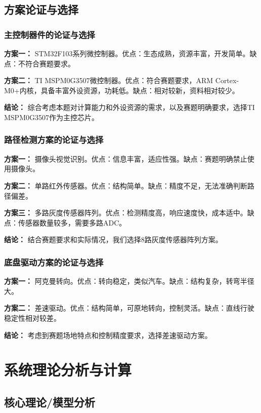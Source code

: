 \documentclass[UTF8]{ctexart}
\begin{document}
\subsection{方案论证与选择}

\subsubsection{主控制器件的论证与选择}

\textbf{方案一：} STM32F103系列微控制器。优点：生态成熟，资源丰富，开发简单。缺点：不符合赛题要求。

\textbf{方案二：} TI MSPM0G3507微控制器。优点：符合赛题要求，ARM Cortex-M0+内核，具备丰富外设资源，功耗低。缺点：相对较新，资料相对较少。

\textbf{结论：} 综合考虑本题对计算能力和外设资源的需求，以及赛题明确要求，选择TI MSPM0G3507作为主控芯片。

\subsubsection{路径检测方案的论证与选择}

\textbf{方案一：} 摄像头视觉识别。优点：信息丰富，适应性强。缺点：赛题明确禁止使用摄像头。

\textbf{方案二：} 单路红外传感器。优点：结构简单。缺点：精度不足，无法准确判断路径偏差。

\textbf{方案三：} 多路灰度传感器阵列。优点：检测精度高，响应速度快，成本适中。缺点：传感器数量较多，需要多路ADC。

\textbf{结论：} 结合赛题要求和实际情况，我们选择8路灰度传感器阵列方案。

\subsubsection{底盘驱动方案的论证与选择}

\textbf{方案一：} 阿克曼转向。优点：转向稳定，类似汽车。缺点：结构复杂，转弯半径大。

\textbf{方案二：} 差速驱动。优点：结构简单，可原地转向，控制灵活。缺点：直线行驶稳定性相对较差。

\textbf{结论：} 考虑到赛题场地特点和控制精度要求，选择差速驱动方案。

\section{系统理论分析与计算}

\subsection{核心理论/模型分析}
\end{document}
